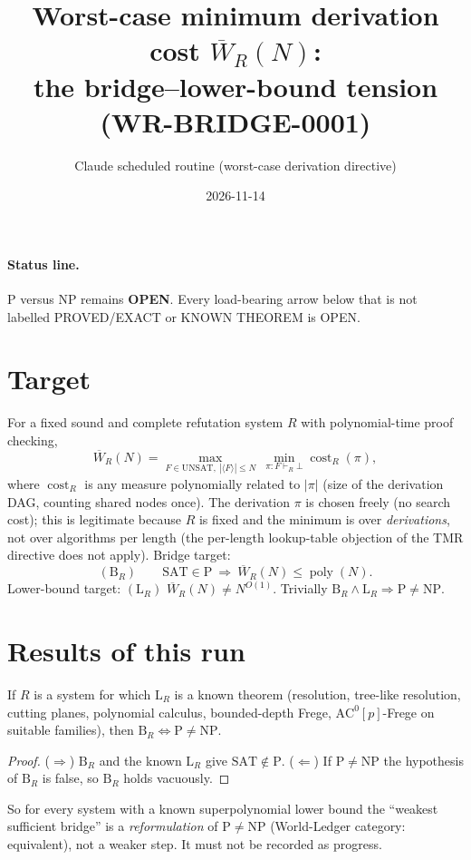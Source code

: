 \documentclass[11pt]{article}
\title{Worst-case minimum derivation cost $\overline W_R(N)$:\\ the bridge--lower-bound tension (WR-BRIDGE-0001)}
\author{Claude scheduled routine (worst-case derivation directive)}
\date{2026-11-14}
\begin{document}
\maketitle

\paragraph{Status line.} P versus NP remains \textbf{OPEN}. Every load-bearing arrow below that is not
labelled PROVED/EXACT or KNOWN THEOREM is OPEN.

\section{Target}
For a fixed sound and complete refutation system $R$ with polynomial-time proof checking,
\[
\overline W_R(N)=\max_{F\in\mathrm{UNSAT},\ |\langle F\rangle|\le N}\ \min_{\pi:F\vdash_R\bot}\operatorname{cost}_R(\pi),
\]
where $\operatorname{cost}_R$ is any measure polynomially related to $|\pi|$ (size of the derivation DAG,
counting shared nodes once). The derivation $\pi$ is chosen freely (no search cost); this is legitimate because
$R$ is fixed and the minimum is over \emph{derivations}, not over algorithms per length (the per-length
lookup-table objection of the TMR directive does not apply). Bridge target:
\[
(\mathrm{B}_R)\qquad \mathrm{SAT}\in\mathrm P\ \Longrightarrow\ \overline W_R(N)\le\operatorname{poly}(N).
\]
Lower-bound target: $(\mathrm L_R)$ $\overline W_R(N)\ne N^{O(1)}$. Trivially $\mathrm B_R\wedge\mathrm L_R\Rightarrow \mathrm P\ne\mathrm{NP}$.

\section{Results of this run}
\begin{proposition}
If $R$ is a system for which $\mathrm L_R$ is a known theorem (resolution, tree-like resolution, cutting planes,
polynomial calculus, bounded-depth Frege, $\mathrm{AC}^0[p]$-Frege on suitable families), then
$\mathrm B_R\iff\mathrm P\neq\mathrm{NP}$.
\end{proposition}
\begin{proof}($\Rightarrow$) $\mathrm B_R$ and the known $\mathrm L_R$ give $\mathrm{SAT}\notin\mathrm P$.
($\Leftarrow$) If $\mathrm P\ne\mathrm{NP}$ the hypothesis of $\mathrm B_R$ is false, so $\mathrm B_R$ holds vacuously.\end{proof}
So for every system with a known superpolynomial lower bound the ``weakest sufficient bridge'' is a
\emph{reformulation} of P$\ne$NP (World-Ledger category: equivalent), not a weaker step. It must not be
recorded as progress.
\end{document}

